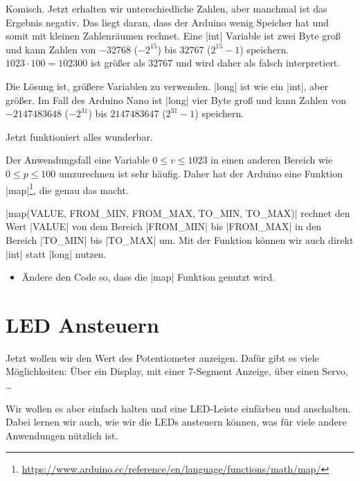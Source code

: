 \documentclass[a4paper,12pt]{book}
\begin{document}
Komisch. Jetzt erhalten wir unterschiedliche Zahlen, aber manchmal ist das Ergebnis negativ.
Das liegt daran, dass der Arduino wenig Speicher hat und somit mit kleinen Zahlenräumen rechnet.
Eine |int| Variable ist zwei Byte groß und kann Zahlen von $-32768$ ($-2^{15}$) bis $32767$ ($2^{15}-1$) speichern.
$1023 \cdot 100 = 102300$ ist größer als $32767$ und wird daher als falsch interpretiert.

Die Lösung ist, größere Variablen zu verwenden. |long| ist wie ein |int|, aber größer. 
Im Fall des Arduino Nano ist |long| vier Byte groß und kann Zahlen von $-2147483648$ ($-2^{31}$) bis $2147483647$ ($2^{31}-1$) speichern.



Jetzt funktioniert alles wunderbar.

Der Anwendungsfall eine Variable $0\leq v \leq 1023$ in einen anderen Bereich wie $0\leq p \leq 100$ umzurechnen ist sehr häufig.
Daher hat der Arduino eine Funktion |map|\footnote{\url{https://www.arduino.cc/reference/en/language/functions/math/map/}},
die genau das macht.

|map(VALUE, FROM_MIN, FROM_MAX, TO_MIN, TO_MAX)| rechnet den Wert |VALUE| von dem Bereich |FROM_MIN| bis |FROM_MAX| in den Bereich |TO_MIN| bis |TO_MAX| um.
Mit der Funktion können wir auch direkt |int| statt |long| nutzen.

\begin{instruction}
  \begin{itemize}
    \item Ändere den Code so, dass die |map| Funktion genutzt wird.
  \end{itemize}
\end{instruction}

\section*{LED Ansteuern}
Jetzt wollen wir den Wert des Potentiometer anzeigen.
Dafür gibt es viele Möglichkeiten: Über ein Display, mit einer 7-Segment Anzeige, über einen Servo, \ldots

Wir wollen es aber einfach halten und eine LED-Leiste einfärben und anschalten.
Dabei lernen wir auch, wie wir die LEDs ansteuern können, was für viele andere Anwendungen nützlich ist.
\end{document}
